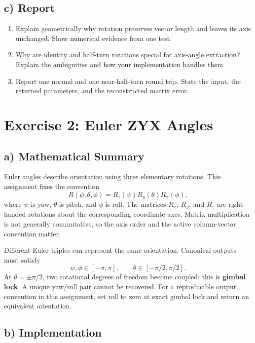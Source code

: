\documentclass[11pt,a4paper]{article}
\begin{document}
\subsection*{c) Report}
\begin{enumerate}[leftmargin=*]
    \item Explain geometrically why rotation preserves vector length and leaves
    its axis unchanged. Show numerical evidence from one test.
    \item Why are identity and half-turn rotations special for axis-angle
    extraction? Explain the ambiguities and how your implementation handles them.
    \item Report one normal and one near-half-turn round trip. State the input,
    the returned parameters, and the reconstructed matrix error.
\end{enumerate}

\section*{Exercise 2: Euler ZYX Angles}

\subsection*{a) Mathematical Summary}

Euler angles describe orientation using three elementary rotations. This
assignment fixes the convention
\[
R(\psi,\theta,\phi)=R_z(\psi)R_y(\theta)R_x(\phi),
\]
where $\psi$ is yaw, $\theta$ is pitch, and $\phi$ is roll. The matrices
$R_x$, $R_y$, and $R_z$ are right-handed rotations about the corresponding
coordinate axes. Matrix multiplication is not generally commutative, so the
axis order and the active column-vector convention matter.

Different Euler triples can represent the same orientation. Canonical outputs
must satisfy
\[
\psi,\phi\in[-\pi,\pi],\qquad
\theta\in[-\pi/2,\pi/2].
\]
At $\theta=\pm\pi/2$, two rotational degrees of freedom become coupled:
this is \textbf{gimbal lock}. A unique yaw/roll pair cannot be recovered. For a
reproducible output convention in this assignment, set roll to zero at exact
gimbal lock and return an equivalent orientation.

\subsection*{b) Implementation}
\end{document}

